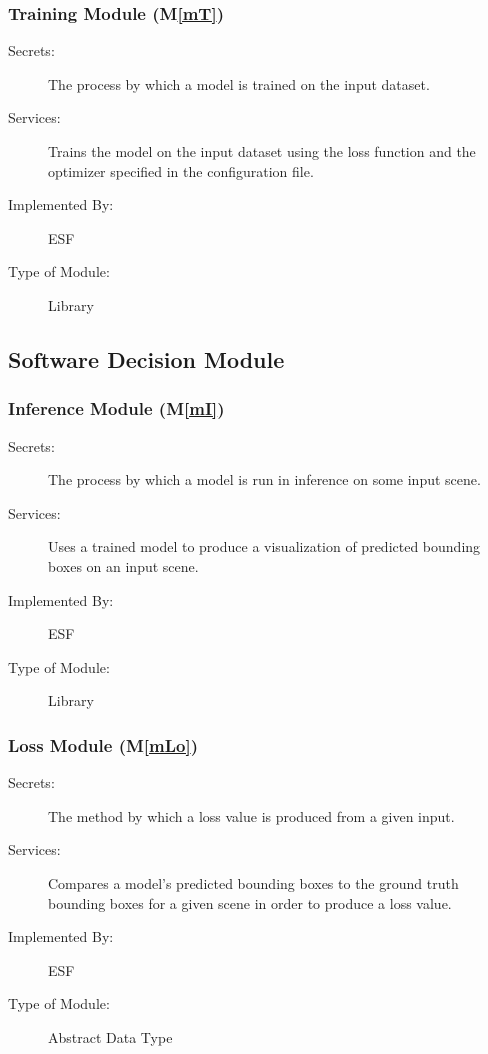 \documentclass[12pt, titlepage]{article}
\newcommand{\ProjectName}{ESF }
\newcommand{\mref}[1]{M\ref{#1}}
\begin{document}
\subsubsection{Training Module (\mref{mT})}
\begin{description}
\item[Secrets:] The process by which a model is trained on the input dataset.
\item[Services:] Trains the model on the input dataset using the loss function and the optimizer specified in the configuration file.
\item[Implemented By:] \ProjectName{}
\item[Type of Module:] Library
\end{description}
\subsection{Software Decision Module}

\subsubsection{Inference Module (\mref{mI})}
\begin{description}
\item[Secrets:] The process by which a model is run in inference on some input scene.
\item[Services:] Uses a trained model to produce a visualization of predicted bounding boxes on an input scene.
\item[Implemented By:] \ProjectName{}
\item[Type of Module:] Library
\end{description}

\subsubsection{Loss Module (\mref{mLo})}
\begin{description}
\item[Secrets:] The method by which a loss value is produced from a given input.
\item[Services:] Compares a model's predicted bounding boxes to the ground truth bounding boxes for a given scene in order to produce a loss value.
\item[Implemented By:] \ProjectName{}
\item[Type of Module:] Abstract Data Type
\end{description}
\end{document}
